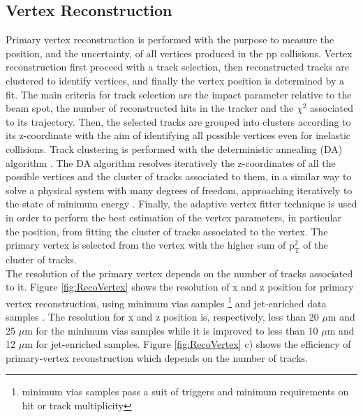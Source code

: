 \subsection{Vertex Reconstruction}


Primary vertex reconstruction is performed with the purpose to measure the position, and the uncertainty, 
of all vertices produced in the pp collisions. Vertex reconstruction first proceed with a 
track selection, then reconstructed tracks are clustered to identify vertices, and finally the vertex position
is determined by a fit. The main criteria for track selection are the impact parameter relative to the beam spot, the
number of reconstructed hits in the tracker and the $\chi^{2}$ associated to its trajectory. Then, the 
selected tracks are grouped into clusters according to its z-coordinate with the aim of identifying
all possible vertices even for inelastic collisions. Track clustering is performed with the 
deterministic annealing (DA) algorithm \cite{VertexRecoBIB}. The DA algorithm resolves iteratively
the z-coordinates of all the possible vertices and the cluster of tracks associated to them, in a similar way 
to solve a physical system with many degrees of freedom, approaching iteratively to the state 
of minimum energy \cite{Chatrchyan:2014fea}. Finally, the adaptive vertex fitter technique \cite{Frühwirth:1027031}
is used in order to perform the best estimation of the vertex parameters, in particular the position,
from fitting the cluster of tracks associated to the vertex. The primary vertex is selected from the vertex with the higher
sum of $\textrm{p}_{\textrm{T}}^{2}$ of the cluster of tracks.\\

The resolution of the primary vertex depends on the number of tracks associated to it. Figure \ref{fig:RecoVertex} 
shows the resolution of x and z position for primary vertex reconstruction, using minimum vias samples 
\footnote{minimum vias samples pass a suit of triggers and minimum requirements on hit 
or track multiplicity} and jet-enriched data samples \cite{Chatrchyan:2014fea}. The resolution for x and z position 
is, respectively, less than 20 $\mu$m and 25 $\mu$m for the minimum vias samples while it is 
improved to less than 10 $\mu$m and 12 $\mu$m for jet-enriched samples. Figure \ref{fig:RecoVertex} c) shows
the efficiency of primary-vertex reconstruction which depends on the number of tracks. 


